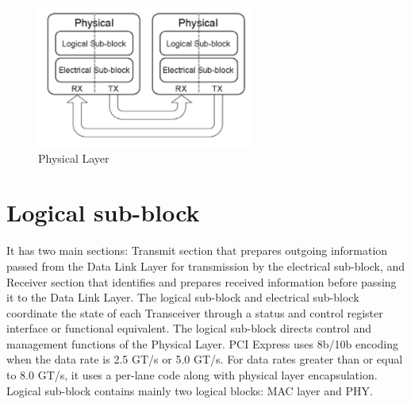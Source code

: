 \begin{figure}[H]
  \centering
  \includegraphics{images/phy.png}
  \caption{Physical Layer}
  \label{lane}
\end{figure}

\section{Logical sub-block}
It has two main sections: Transmit section that prepares outgoing information passed
from the Data Link Layer for transmission by the electrical sub-block, and Receiver
section that identifies and prepares received information before passing it to the Data
Link Layer. The logical sub-block and electrical sub-block coordinate the state of each
Transceiver through a status and control register interface or functional equivalent. The
logical sub-block directs control and management functions of the Physical Layer. PCI
Express uses 8b/10b encoding when the data rate is 2.5 GT/s or 5.0 GT/s. For data rates
greater than or equal to 8.0 GT/s, it uses a per-lane code along with physical layer
encapsulation.\newline \newline 
Logical sub-block contains mainly two logical blocks: MAC layer and PHY.

